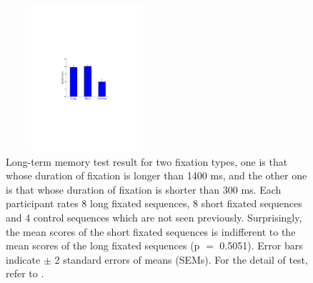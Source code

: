 \documentclass[10pt,letterpaper]{article}
\begin{document}
\begin{figure}
  \centerline{\includegraphics[width=60mm,height=54mm,trim=65mm 103mm 68mm 100mm]{./eps/memtest_leng}}
  \caption{Long-term memory test result for two fixation types, one is that whose duration of fixation is longer than 1400 ms, and the other one is that whose duration of fixation is shorter than 300 ms. Each participant rates 8 long fixated sequences, 8 short fixated sequences and 4 control sequences which are not seen previously. Surprisingly, the mean scores of the short fixated sequences is indifferent to the mean scores of the long fixated sequences (p $=$ 0.5051). Error bars indicate $\pm$ 2 standard errors of means (SEMs). For the detail of test, refer to \textit{}.}
  \label{fig:memtest-leng}
\end{figure}
\end{document}
